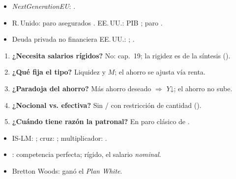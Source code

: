 \documentclass{article}
\begin{document}
\begin{columnas}
\anexorepaso
{}
\begin{itemize}
\item \emph{NextGenerationEU}: .
\item R.\,Unido: paro asegurados . EE.\,UU.: PIB ; paro .
\item Deuda privada no financiera EE.\,UU.: ; .
\end{itemize}
\begin{enumerate}
\item \textbf{¿Necesita  salarios rígidos?} No: cap.~19; la rigidez es de la síntesis ().
\item \textbf{¿Qué fija el tipo?} Liquidez y $M$; el ahorro se ajusta vía renta.
\item \textbf{¿Paradoja del ahorro?} Más ahorro deseado $\Rightarrow$ $Y$↓; el ahorro no sube.
\item \textbf{¿Nocional vs. efectiva?} Sin / con restricción de cantidad ().
\item \textbf{¿Cuándo tiene razón la patronal?} En paro clásico de .
\end{enumerate}
\begin{trampa}
\begin{itemize}
\item IS-LM: ; cruz: ; multiplicador: .
\item {}: competencia perfecta; rígido, el salario \emph{nominal}.
\item Bretton Woods: ganó el \emph{Plan White}.
\end{itemize}
\end{trampa}

\end{columnas}
\end{document}
